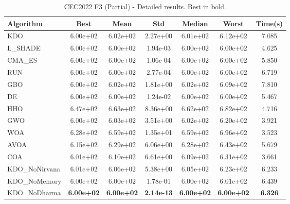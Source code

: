 \begin{table}[H]
\centering\small
\caption{CEC2022 F3 (Partial) - Detailed results. Best in bold.}
\label{tab:cec2022_F3}
\begin{tabular}{lcccccc}
\toprule
\textbf{Algorithm} & \textbf{Best} & \textbf{Mean} & \textbf{Std} & \textbf{Median} & \textbf{Worst} & \textbf{Time(s)} \\
\midrule
KDO & 6.00e+02 & 6.02e+02 & 2.27e+00 & 6.01e+02 & 6.12e+02 & 7.085 \\
L_SHADE & 6.00e+02 & 6.00e+02 & 1.94e-03 & 6.00e+02 & 6.00e+02 & 4.625 \\
CMA_ES & 6.00e+02 & 6.00e+02 & 1.06e-04 & 6.00e+02 & 6.00e+02 & 5.850 \\
RUN & 6.00e+02 & 6.00e+02 & 2.77e-04 & 6.00e+02 & 6.00e+02 & 6.719 \\
GBO & 6.00e+02 & 6.02e+02 & 1.81e+00 & 6.02e+02 & 6.09e+02 & 7.810 \\
DE & 6.00e+02 & 6.00e+02 & 1.24e-02 & 6.00e+02 & 6.00e+02 & 5.467 \\
HHO & 6.47e+02 & 6.63e+02 & 8.36e+00 & 6.62e+02 & 6.82e+02 & 4.716 \\
GWO & 6.00e+02 & 6.03e+02 & 3.51e+00 & 6.02e+02 & 6.20e+02 & 3.921 \\
WOA & 6.28e+02 & 6.59e+02 & 1.35e+01 & 6.59e+02 & 6.96e+02 & 3.523 \\
AVOA & 6.15e+02 & 6.29e+02 & 6.06e+00 & 6.28e+02 & 6.43e+02 & 5.679 \\
COA & 6.01e+02 & 6.10e+02 & 6.61e+00 & 6.09e+02 & 6.31e+02 & 3.661 \\
KDO_NoNirvana & 6.01e+02 & 6.06e+02 & 5.38e+00 & 6.05e+02 & 6.23e+02 & 6.233 \\
KDO_NoMemory & 6.00e+02 & 6.00e+02 & 1.78e-01 & 6.00e+02 & 6.01e+02 & 6.439 \\
KDO_NoDharma & \textbf{6.00e+02} & \textbf{6.00e+02} & \textbf{2.14e-13} & \textbf{6.00e+02} & \textbf{6.00e+02} & \textbf{6.326} \\
\bottomrule
\end{tabular}
\end{table}
